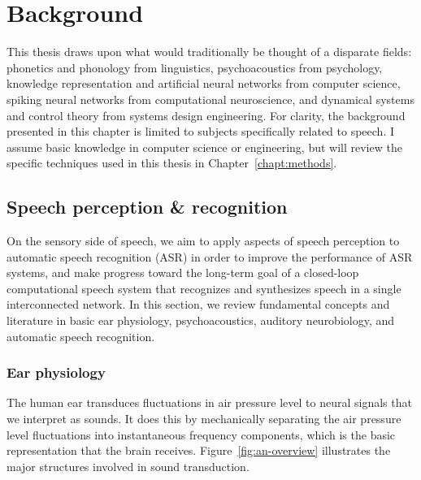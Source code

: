 \chapter{Background}
\label{chapt:bg}

This thesis draws upon
what would traditionally be thought of a disparate fields:
phonetics and phonology from linguistics,
psychoacoustics from psychology,
knowledge representation
and artificial neural networks from computer science,
spiking neural networks
from computational neuroscience,
and dynamical systems and control theory
from systems design engineering.
For clarity, the background presented
in this chapter is limited
to subjects specifically related to speech.
I assume basic knowledge in
computer science or engineering,
but will review the specific techniques
used in this thesis
in Chapter~\ref{chapt:methods}.

\section{Speech perception \& recognition}

On the sensory side of speech,
we aim to apply aspects of speech perception
to automatic speech recognition (ASR)
in order to
improve the performance of ASR systems,
and make progress toward
the long-term goal of a closed-loop
computational speech system
that recognizes and synthesizes speech
in a single interconnected network.
In this section,
we review fundamental concepts and literature
in basic ear physiology,
psychoacoustics,
auditory neurobiology,
and automatic speech recognition.

\subsection{Ear physiology}

The human ear transduces fluctuations in
air pressure level to neural signals
that we interpret as sounds.
It does this by mechanically
separating the air pressure level fluctuations
into instantaneous frequency components,
which is the basic representation
that the brain receives.
Figure~\ref{fig:an-overview} illustrates
the major structures involved
in sound transduction.


